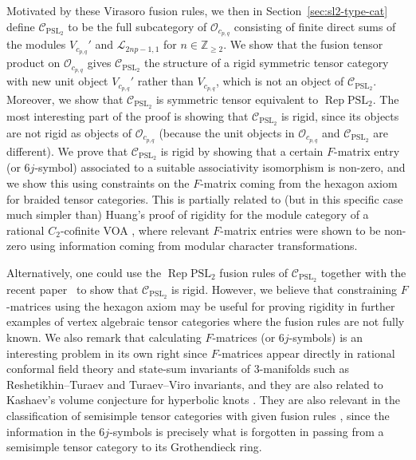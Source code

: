 \documentclass[pdftex]{sigma}
\numberwithin{equation}{section}
\theoremstyle{definition}
\begin{document}
Motivated by these Virasoro fusion rules, we then in Section~\ref{sec:sl2-type-cat} define $\mathcal{C}_{\mathrm{PSL}_2}$ to be the full subcategory of $\mathcal{O}_{c_{p,q}}$ consisting of finite direct sums of the modules $V_{c_{p,q}}'$ and $\mathcal{L}_{2np-1,1}$ for $n\in\mathbb{Z}_{\geq 2}$. We show that the fusion tensor product on $\mathcal{O}_{c_{p,q}}$ gives $\mathcal{C}_{\mathrm{PSL}_2}$ the structure of a rigid symmetric tensor category with new unit object $V_{c_{p,q}}'$ rather than $V_{c_{p,q}}$, which is not an object of $\mathcal{C}_{\mathrm{PSL}_2}$. Moreover, we show that $\mathcal{C}_{\mathrm{PSL}_2}$ is symmetric tensor equivalent to $\operatorname{Rep} \mathrm{PSL}_2$. The most interesting part of the proof is showing that $\mathcal{C}_{\mathrm{PSL}_2}$ is rigid, since its objects are not rigid as objects of $\mathcal{O}_{c_{p,q}}$ (because the unit objects in $\mathcal{O}_{c_{p,q}}$ and $\mathcal{C}_{\mathrm{PSL}_2}$ are different). We prove that $\mathcal{C}_{\mathrm{PSL}_2}$ is rigid by showing that a certain $F$-matrix entry (or $6j$-symbol) associated to a suitable associativity isomorphism is non-zero, and we show this using constraints on the $F$-matrix coming from the hexagon axiom for braided tensor categories. This is partially related to (but in this specific case much simpler than) Huang's proof of rigidity for the module category of a rational $C_2$-cofinite VOA \cite{Hu-rigidity}, where relevant $F$-matrix entries were shown to be non-zero using information coming from modular character transformations.

Alternatively, one could use the $\operatorname{Rep} \mathrm{PSL}_2$ fusion rules of $\mathcal{C}_{\mathrm{PSL}_2}$ together with the recent paper~\cite{EP} to show that $\mathcal{C}_{\mathrm{PSL}_2}$ is rigid. However,
we believe that constraining $F$-matrices using the hexagon axiom may be useful for proving rigidity in further examples of vertex algebraic tensor categories where the fusion rules are not fully known. We also remark that calculating $F$-matrices (or $6j$-symbols) is an interesting problem in its own right since $F$-matrices appear directly in rational conformal field theory \cite{MS} and state-sum invariants of $3$-manifolds such as Reshetikhin--Turaev \cite{RT} and Turaev--Viro \cite{TV} invariants, and they are also related to Kashaev's volume conjecture for hyperbolic knots \cite{Ka}. They are also relevant in the classification of semisimple tensor categories with given fusion rules \cite{RSW}, since the information in the $6j$-symbols is precisely what is forgotten in passing from a semisimple tensor category to its Grothendieck ring.
\end{document}
